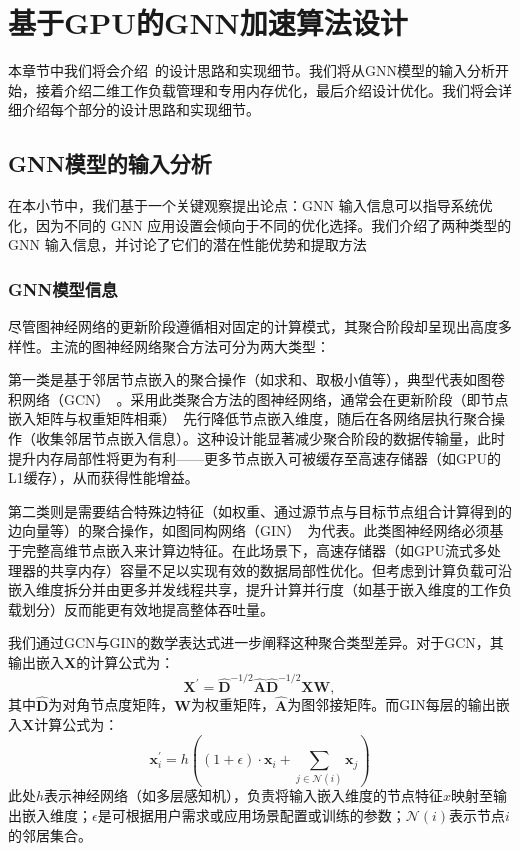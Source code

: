 \section{基于GPU的GNN加速算法设计}
\label{sect: design}

本章节中我们将会介绍~\Mname{}的设计思路和实现细节。我们将从GNN模型的输入分析开始，接着介绍二维工作负载管理和专用内存优化，最后介绍设计优化。我们将会详细介绍每个部分的设计思路和实现细节。
\subsection{GNN模型的输入分析}
在本小节中，我们基于一个关键观察提出论点：GNN 输入信息可以指导系统优化，因为不同的 GNN 应用设置会倾向于不同的优化选择。我们介绍了两种类型的 GNN 输入信息，并讨论了它们的潜在性能优势和提取方法
\subsubsection{GNN模型信息}
尽管图神经网络的更新阶段遵循相对固定的计算模式，其聚合阶段却呈现出高度多样性。主流的图神经网络聚合方法可分为两大类型：

第一类是基于邻居节点嵌入的聚合操作（如求和、取极小值等），典型代表如图卷积网络（GCN）~\cite{GCNConv}。采用此类聚合方法的图神经网络，通常会在更新阶段（即节点嵌入矩阵与权重矩阵相乘）~\cite{GCNConv, pyG, wang2019dgl}先行降低节点嵌入维度，随后在各网络层执行聚合操作（收集邻居节点嵌入信息）。这种设计能显著减少聚合阶段的数据传输量，此时提升内存局部性将更为有利——更多节点嵌入可被缓存至高速存储器（如GPU的L1缓存），从而获得性能增益。

第二类则是需要结合特殊边特征（如权重、通过源节点与目标节点组合计算得到的边向量等）的聚合操作，如图同构网络（GIN）~\cite{GINConv}为代表。此类图神经网络必须基于完整高维节点嵌入来计算边特征。在此场景下，高速存储器（如GPU流式多处理器的共享内存）容量不足以实现有效的数据局部性优化。但考虑到计算负载可沿嵌入维度拆分并由更多并发线程共享，提升计算并行度（如基于嵌入维度的工作负载划分）反而能更有效地提高整体吞吐量。

我们通过GCN与GIN的数学表达式进一步阐释这种聚合类型差异。对于GCN，其输出嵌入$\mathbf{X}$的计算公式为：
\begin{equation}
    \mathbf{X}^{\prime} = \mathbf{\hat{D}}^{-1/2} \mathbf{\hat{A}}
    \mathbf{\hat{D}}^{-1/2} \mathbf{X} \mathbf{W},
\end{equation}
其中$\mathbf{\hat{D}}$为对角节点度矩阵，$\mathbf{W}$为权重矩阵，$\mathbf{\hat{A}}$为图邻接矩阵。而GIN每层的输出嵌入$\mathbf{X}$计算公式为：
\begin{equation}
    \mathbf{x}^{\prime}_i = h \left( (1 + \epsilon) \cdot
            \mathbf{x}_i + \sum_{j \in \mathcal{N}(i)} \mathbf{x}_j \right)    
\end{equation}
此处$h$表示神经网络（如多层感知机），负责将输入嵌入维度的节点特征$x$映射至输出嵌入维度；$\epsilon$是可根据用户需求或应用场景配置或训练的参数；$\mathcal{N}(i)$表示节点$i$的邻居集合。

